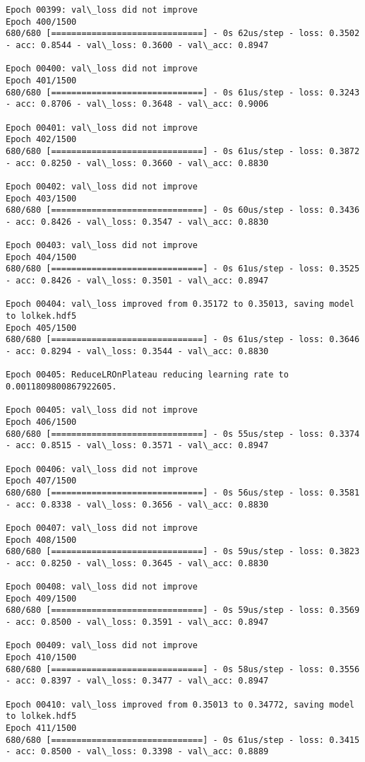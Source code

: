 \documentclass[11pt]{article}
\begin{document}
\begin{Verbatim}[commandchars=\\\{\}]
Epoch 00399: val\_loss did not improve
Epoch 400/1500
680/680 [==============================] - 0s 62us/step - loss: 0.3502 - acc: 0.8544 - val\_loss: 0.3600 - val\_acc: 0.8947

Epoch 00400: val\_loss did not improve
Epoch 401/1500
680/680 [==============================] - 0s 61us/step - loss: 0.3243 - acc: 0.8706 - val\_loss: 0.3648 - val\_acc: 0.9006

Epoch 00401: val\_loss did not improve
Epoch 402/1500
680/680 [==============================] - 0s 61us/step - loss: 0.3872 - acc: 0.8250 - val\_loss: 0.3660 - val\_acc: 0.8830

Epoch 00402: val\_loss did not improve
Epoch 403/1500
680/680 [==============================] - 0s 60us/step - loss: 0.3436 - acc: 0.8426 - val\_loss: 0.3547 - val\_acc: 0.8830

Epoch 00403: val\_loss did not improve
Epoch 404/1500
680/680 [==============================] - 0s 61us/step - loss: 0.3525 - acc: 0.8426 - val\_loss: 0.3501 - val\_acc: 0.8947

Epoch 00404: val\_loss improved from 0.35172 to 0.35013, saving model to lolkek.hdf5
Epoch 405/1500
680/680 [==============================] - 0s 61us/step - loss: 0.3646 - acc: 0.8294 - val\_loss: 0.3544 - val\_acc: 0.8830

Epoch 00405: ReduceLROnPlateau reducing learning rate to 0.0011809800867922605.

Epoch 00405: val\_loss did not improve
Epoch 406/1500
680/680 [==============================] - 0s 55us/step - loss: 0.3374 - acc: 0.8515 - val\_loss: 0.3571 - val\_acc: 0.8947

Epoch 00406: val\_loss did not improve
Epoch 407/1500
680/680 [==============================] - 0s 56us/step - loss: 0.3581 - acc: 0.8338 - val\_loss: 0.3656 - val\_acc: 0.8830

Epoch 00407: val\_loss did not improve
Epoch 408/1500
680/680 [==============================] - 0s 59us/step - loss: 0.3823 - acc: 0.8250 - val\_loss: 0.3645 - val\_acc: 0.8830

Epoch 00408: val\_loss did not improve
Epoch 409/1500
680/680 [==============================] - 0s 59us/step - loss: 0.3569 - acc: 0.8500 - val\_loss: 0.3591 - val\_acc: 0.8947

Epoch 00409: val\_loss did not improve
Epoch 410/1500
680/680 [==============================] - 0s 58us/step - loss: 0.3556 - acc: 0.8397 - val\_loss: 0.3477 - val\_acc: 0.8947

Epoch 00410: val\_loss improved from 0.35013 to 0.34772, saving model to lolkek.hdf5
Epoch 411/1500
680/680 [==============================] - 0s 61us/step - loss: 0.3415 - acc: 0.8500 - val\_loss: 0.3398 - val\_acc: 0.8889


\end{Verbatim}
\end{document}
